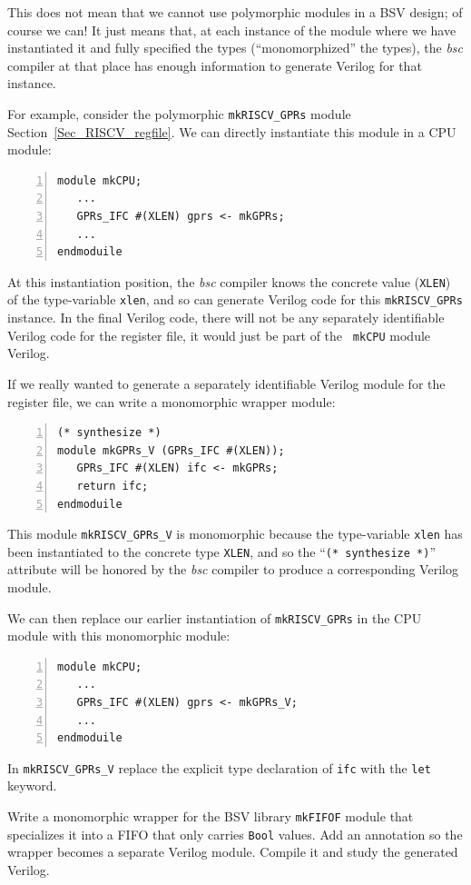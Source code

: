 This does not mean that we cannot use polymorphic modules in a BSV
design; of course we can!  It just means that, at each instance of the
module where we have instantiated it and fully specified the types
(``monomorphized'' the types), the \emph{bsc} compiler at that place
has enough information to generate Verilog for that instance.

For example, consider the polymorphic {\tt mkRISCV\_GPRs} module
Section~\ref{Sec_RISCV_regfile}.  We can directly instantiate this
module in a CPU module:

{\small
\begin{Verbatim}[frame=single, numbers=left]
module mkCPU;
   ...
   GPRs_IFC #(XLEN) gprs <- mkGPRs;
   ...
endmoduile
\end{Verbatim}
}

At this instantiation position, the \emph{bsc} compiler knows the
concrete value ({\tt XLEN}) of the type-variable {\tt xlen}, and so
can generate Verilog code for this {\tt mkRISCV\_GPRs} instance.  In
the final Verilog code, there will not be any separately identifiable
Verilog code for the register file, it would just be part of the {\tt
mkCPU} module Verilog.

If we really wanted to generate a separately identifiable Verilog
module for the register file, we can write a monomorphic wrapper
module:

{\small
\begin{Verbatim}[frame=single, numbers=left]
(* synthesize *)
module mkGPRs_V (GPRs_IFC #(XLEN));
   GPRs_IFC #(XLEN) ifc <- mkGPRs;
   return ifc;
endmoduile
\end{Verbatim}
}

This module {\tt mkRISCV\_GPRs\_V} is monomorphic because the
type-variable {\tt xlen} has been instantiated to the concrete type
{\tt XLEN}, and so the ``{\tt (* synthesize *)}'' attribute will be
honored by the \emph{bsc} compiler to produce a corresponding Verilog
module.

We can then replace our earlier instantiation of {\tt mkRISCV\_GPRs}
in the CPU module with this monomorphic module:

{\small
\begin{Verbatim}[frame=single, numbers=left]
module mkCPU;
   ...
   GPRs_IFC #(XLEN) gprs <- mkGPRs_V;
   ...
endmoduile
\end{Verbatim}
}

\hdivider

\Exercise

\hm In {\tt mkRISCV\_GPRs\_V} replace the explicit type declaration
of {\tt ifc} with the {\tt let} keyword.

\Exercise

\hm Write a monomorphic wrapper for the BSV library {\tt mkFIFOF}
module that specializes it into a FIFO that only carries {\tt Bool}
values.  Add an annotation so the wrapper becomes a separate Verilog
module.  Compile it and study the generated Verilog.

\Endexercise


